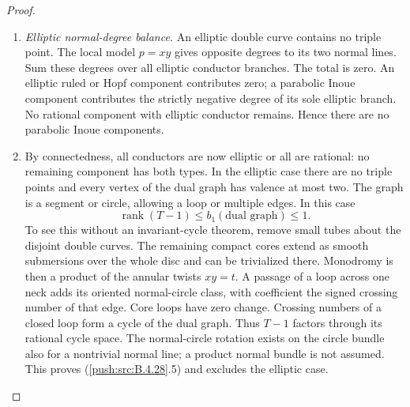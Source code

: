 \begin{proof}
\begin{enumerate}[label=\arabic*.,leftmargin=*]
\item \emph{Elliptic normal-degree balance.}
An elliptic double curve contains no triple point.
The local model $p=xy$ gives opposite degrees to its
two normal lines. Sum these degrees over all elliptic
conductor branches. The total is zero. An elliptic
ruled or Hopf component contributes zero; a parabolic
Inoue component contributes the strictly negative
degree of its sole elliptic branch. No rational
component with elliptic conductor remains. Hence there
are no parabolic Inoue components.

\item By connectedness, all conductors are now elliptic or
all are rational: no remaining component has both
types. In the elliptic case there are no triple points
and every vertex of the dual graph has valence at most
two. The graph is a segment or circle, allowing a loop
or multiple edges. In this case
\[
 \operatorname{rank}(T-1)\le b_1(\text{dual graph})
 \le1.                                               \tag{B.4.28.5}
\]
To see this without an invariant-cycle theorem, remove
small tubes about the disjoint double curves. The
remaining compact cores extend as smooth submersions
over the whole disc and can be trivialized there.
Monodromy is then a product of the annular twists
$xy=t$. A passage of a loop across one neck adds its
oriented normal-circle class, with coefficient the
signed crossing number of that edge. Core loops have
zero change. Crossing numbers of a closed loop form a
cycle of the dual graph. Thus $T-1$ factors through its
rational cycle space. The normal-circle rotation exists
on the circle bundle also for a nontrivial normal line;
a product normal bundle is not assumed. This proves
(\ref{push:src:B.4.28}.5) and excludes the elliptic case.


\end{enumerate}
\end{proof}
